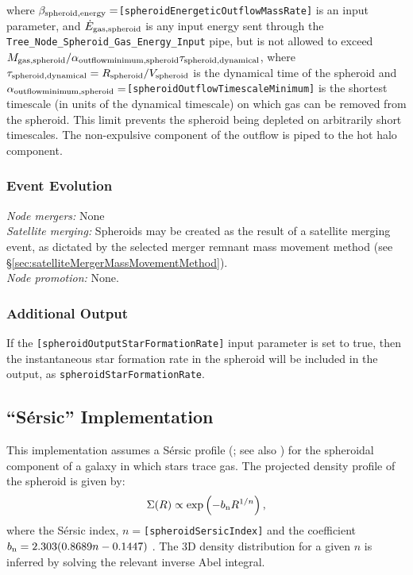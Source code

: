 where $\beta_{\rm spheroid, energy}=${\tt [spheroidEnergeticOutflowMassRate]} is an input parameter, and $\dot{E}_{\rm gas,spheroid}$ is any input energy sent through the {\tt Tree\_Node\_Spheroid\_Gas\_Energy\_Input} pipe, but is not allowed to exceed $M_{\rm gas, spheroid}/ \alpha_{\rm outflow minimum, spheroid} \tau_{\rm spheroid, dynamical}$, where $\tau_{\rm spheroid, dynamical}=R_{\rm spheroid}/V_{\rm spheroid}$ is the dynamical time of the spheroid and $\alpha_{\rm outflow minimum, spheroid}=${\tt [spheroidOutflowTimescaleMinimum]} is the shortest timescale (in units of the dynamical timescale) on which gas can be removed from the spheroid. This limit prevents the spheroid being depleted on arbitrarily short timescales. The non-expulsive component of the outflow is piped to the hot halo component.

\subsubsection{Event Evolution}

\noindent\emph{Node mergers:} None\\

\noindent\emph{Satellite merging:} Spheroids may be created as the result of a satellite merging event, as dictated by the selected merger remnant mass movement method (see \S\ref{sec:satelliteMergerMassMovementMethod}).\\

\noindent\emph{Node promotion:} None.\\

\subsubsection{Additional Output}

If the {\tt [spheroidOutputStarFormationRate]} input parameter is set to true, then the instantaneous star formation rate in the spheroid will be included in the output, as {\tt spheroidStarFormationRate}.

\subsection{``S\'ersic'' Implementation}

This implementation assumes a S\'ersic profile (\citealt{sersic_influence_1963}; see also \citealt{mazure_exact_2002}) for the spheroidal component of a galaxy in which stars trace gas. The projected density profile of the spheroid is given by:
\begin{equation}
 \Sigma(R) \propto \exp\left(-b_{\rm n} R^{1/n} \right),
\end{equation}
where the S\'ersic index, $n=${\tt [spheroidSersicIndex]} and the coefficient $b_{\rm n}=2.303(0.8689 n-0.1447)$ \cite{wadadekar_two-dimensional_1999}. The 3D density distribution for a given $n$ is inferred by solving the relevant inverse Abel integral.

